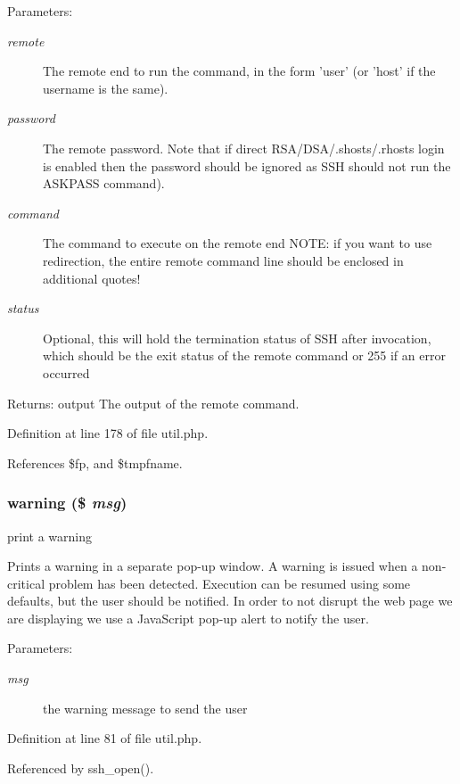 \begin{Desc}
\item[Parameters:]
\begin{description}
\item[{\em remote}]The remote end to run the command, in the form 'user' (or 'host' if the username is the same). \item[{\em password}]The remote password. Note that if direct RSA/DSA/.shosts/.rhosts login is enabled then the password should be ignored as SSH should not run the ASKPASS command). \item[{\em command}]The command to execute on the remote end NOTE: if you want to use redirection, the entire remote command line should be enclosed in additional quotes! \item[{\em status}]Optional, this will hold the termination status of SSH after invocation, which should be the exit status of the remote command or 255 if an error occurred \end{description}
\end{Desc}
\begin{Desc}
\item[Returns:]output The output of the remote command. \end{Desc}


Definition at line 178 of file util.php.

References \$fp, and \$tmpfname.
\subsubsection{\setlength{\rightskip}{0pt plus 5cm}warning (\$ {\em msg})}\label{util_8php_a2}


print a warning 

Prints a warning in a separate pop-up window. A warning is issued when a non-critical problem has been detected. Execution can be resumed using some defaults, but the user should be notified. In order to not disrupt the web page we are displaying we use a Java\-Script pop-up alert to notify the user.

\begin{Desc}
\item[Parameters:]
\begin{description}
\item[{\em msg}]the warning message to send the user \end{description}
\end{Desc}


Definition at line 81 of file util.php.

Referenced by ssh\_\-open().